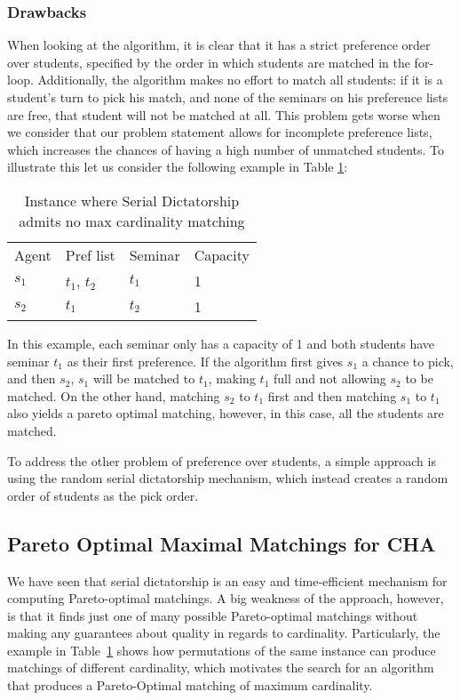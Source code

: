 \subsubsection{Drawbacks}
When looking at the algorithm, it is clear that it has a strict preference order over students, specified by the order in which students are matched in the for-loop. Additionally, the algorithm makes no effort to match all students: if it is a student's turn to pick his match, and none of the seminars on his preference lists are free, that student will not be matched at all. This problem gets worse when we consider that our problem statement allows for incomplete preference lists, which increases the chances of having a high number of unmatched students. To illustrate this let us consider the following example in Table \ref{table:1}:
\begin{table}[h!]
    \centering 
    \begin{tabular}{llll}
    Agent   & Pref list     & Seminar   & Capacity \\
    $s_1$   & $t_1$, $t_2$  & $t_1$     & 1        \\
    $s_2$   & $t_1$         & $t_2$     & 1       
    \end{tabular}
    \caption{Instance where Serial Dictatorship admits no max cardinality matching}
    \label{table:1}
\end{table} 
In this example, each seminar only has a capacity of 1 and both students have seminar $t_1$ as their first preference. If the algorithm first gives $s_1$ a chance to pick, and then $s_2$, $s_1$ will be matched to $t_1$, making $t_1$ full and not allowing $s_2$ to be matched. On the other hand, matching $s_2$ to $t_1$ first and then matching $s_1$ to $t_1$ also yields a pareto optimal matching, however, in this case, all the students are matched.

To address the other problem of preference over students, a simple approach is using the random serial dictatorship mechanism, which instead creates a random order of students as the pick order.

\subsection{Pareto Optimal Maximal Matchings for CHA}\label{algo-max-po}
We have seen that serial dictatorship is an easy and time-efficient mechanism for computing Pareto-optimal matchings. A big weakness of the approach, however, is that it finds just one of many possible Pareto-optimal matchings without making any guarantees about quality in regards to cardinality. Particularly, the example in \mbox{Table \ref{table:1}} shows how permutations of the same instance can produce matchings of different cardinality, which motivates the search for an algorithm that produces a Pareto-Optimal matching of maximum cardinality. 

